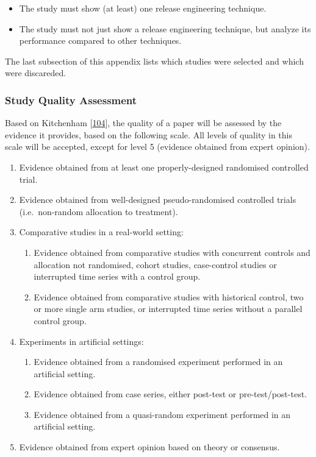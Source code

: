 \documentclass[]{book}
\providecommand{\tightlist}{%
  \setlength{\itemsep}{0pt}\setlength{\parskip}{0pt}}
\begin{document}
\begin{itemize}
\tightlist
\item
  The study must show (at least) one release engineering technique.
\item
  The study must not just show a release engineering technique, but
  analyze its performance compared to other techniques.
\end{itemize}

The last subsection of this appendix lists which studies were selected
and which were discareded.

\subsubsection{Study Quality Assessment}\label{study-quality-assessment}

Based on Kitchenham
{[}\protect\hyperlink{ref-kitchenham2004procedures}{104}{]}, the quality
of a paper will be assessed by the evidence it provides, based on the
following scale. All levels of quality in this scale will be accepted,
except for level 5 (evidence obtained from expert opinion).

\begin{enumerate}
\def\labelenumi{\arabic{enumi}.}
\tightlist
\item
  Evidence obtained from at least one properly-designed randomised
  controlled trial.
\item
  Evidence obtained from well-designed pseudo-randomised controlled
  trials (i.e.~non-random allocation to treatment).
\item
  Comparative studies in a real-world setting:

  \begin{enumerate}
  \def\labelenumii{\arabic{enumii}.}
  \tightlist
  \item
    Evidence obtained from comparative studies with concurrent controls
    and allocation not randomised, cohort studies, case-control studies
    or interrupted time series with a control group.
  \item
    Evidence obtained from comparative studies with historical control,
    two or more single arm studies, or interrupted time series without a
    parallel control group.
  \end{enumerate}
\item
  Experiments in artificial settings:

  \begin{enumerate}
  \def\labelenumii{\arabic{enumii}.}
  \tightlist
  \item
    Evidence obtained from a randomised experiment performed in an
    artificial setting.
  \item
    Evidence obtained from case series, either post-test or
    pre-test/post-test.
  \item
    Evidence obtained from a quasi-random experiment performed in an
    artificial setting.
  \end{enumerate}
\item
  Evidence obtained from expert opinion based on theory or consensus.
\end{enumerate}
\end{document}
